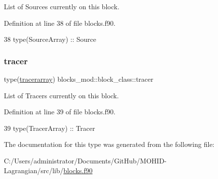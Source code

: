 List of Sources currently on this block. 



Definition at line 38 of file blocks.\+f90.


\begin{DoxyCode}
38         \textcolor{keywordtype}{type}(SourceArray) :: Source
\end{DoxyCode}
\mbox{\label{structblocks__mod_1_1block__class_ac1deffab20b882618041f0dcc0e58c22}} 
\subsubsection{\texorpdfstring{tracer}{tracer}}
{\footnotesize\ttfamily type(\mbox{\hyperlink{structtracer__array__mod_1_1tracerarray}{tracerarray}}) blocks\+\_\+mod\+::block\+\_\+class\+::tracer\hspace{0.3cm}{\ttfamily [private]}}



List of Tracers currently on this block. 



Definition at line 39 of file blocks.\+f90.


\begin{DoxyCode}
39         \textcolor{keywordtype}{type}(TracerArray) :: Tracer
\end{DoxyCode}


The documentation for this type was generated from the following file\+:\begin{DoxyCompactItemize}
\item 
C\+:/\+Users/administrator/\+Documents/\+Git\+Hub/\+M\+O\+H\+I\+D-\/\+Lagrangian/src/lib/\mbox{\hyperlink{blocks_8f90}{blocks.\+f90}}\end{DoxyCompactItemize}
